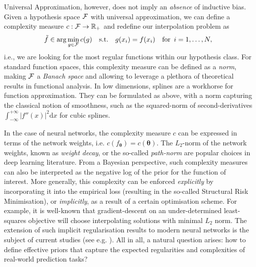 

Universal Approximation, however, does not imply an {\em absence} of inductive bias. Given a hypothesis space ${\mathcal{F}}$ with universal approximation, we can define a complexity measure $c: {\mathcal{F}} \to \mathbb{R}_{+}$ and redefine our interpolation problem as 
$$
\tilde{f} \in \arg\min_{g \in {\mathcal{F}}} c(g) \quad \mathrm{s.t.} \quad g(x_i) = f(x_i)  \quad \mathrm{for} \,\,\, i=1, \hdots, N,
$$
i.e., we are looking for the most regular functions within our hypothesis class. 
%
For standard function spaces, this complexity measure can be defined as a {\em norm}, making ${\mathcal{F}}$ a {\em Banach space} and allowing to leverage a plethora of theoretical results in functional analysis. 
%
In low dimensions, splines are a workhorse for function approximation. They can be formulated as above, with a norm capturing 
the classical notion of smoothness, such as the squared-norm of second-derivatives $\int_{-\infty}^{+\infty} |f''(x)|^2 \mathrm{d}x$ for cubic splines. 



In the case of neural networks,  the complexity measure $c$ can be expressed in terms of the network weights, i.e. $c(f_{\boldsymbol{\theta}}) = {c}(\boldsymbol{\theta})$.
%
The $L_2$-norm of the network weights, known as \emph{weight decay}, or the so-called \emph{path-norm} \citep{neyshabur2015norm} are popular choices in deep learning literature.  
%
%
From a Bayesian perspective, such complexity measures can also be interpreted as the negative log of the prior for the function of interest. More generally, this complexity can be enforced \emph{explicitly} by incorporating it into the empirical loss (resulting in the so-called Structural Risk Minimisation), or \emph{implicitly}, as a result of a certain optimisation scheme. For example, it is well-known that gradient-descent on an under-determined least-squares objective will choose interpolating solutions with minimal $L_2$ norm. The extension of such implicit regularisation results to modern neural networks is the subject of current studies (see e.g. \cite{blanc2020implicit, shamir2020implicit, razin2020implicit, gunasekar2017implicit}).   
All in all, a natural question arises: how to define effective priors that capture the expected regularities and complexities of real-world prediction tasks? 




